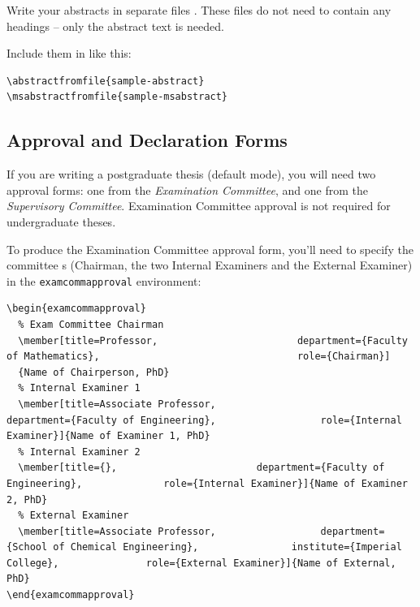 \documentclass[a4paper,nofonts,raggedright,titlepage,openany]{tufte-book}
\begin{document}
Write your abstracts in separate files . These files do not need to contain any headings -- only the abstract text is needed.

Include them in  like this:
\begin{verbatim}
\abstractfromfile{sample-abstract}
\msabstractfromfile{sample-msabstract}
\end{verbatim}



\subsection{Approval and Declaration Forms}
\label{sec:approval}

If you are writing a postgraduate thesis (default mode), you will need two approval forms: one from the \emph{Examination Committee}, and one from the \emph{Supervisory Committee}. Examination Committee approval is  not required for undergraduate theses.

To produce the Examination Committee approval form, you'll need to specify the committee \texttt{\member}s (Chairman, the two Internal Examiners and the External Examiner) in the \texttt{examcommapproval} environment: 



\begin{verbatim}
\begin{examcommapproval}
  % Exam Committee Chairman
  \member[title=Professor,                        department={Faculty of Mathematics},                                  role={Chairman}]
  {Name of Chairperson, PhD}
  % Internal Examiner 1
  \member[title=Associate Professor,                         department={Faculty of Engineering},                  role={Internal Examiner}]{Name of Examiner 1, PhD}
  % Internal Examiner 2
  \member[title={},                        department={Faculty of Engineering},              role={Internal Examiner}]{Name of Examiner 2, PhD}
  % External Examiner
  \member[title=Associate Professor,                  department={School of Chemical Engineering},                institute={Imperial College},               role={External Examiner}]{Name of External, PhD}
\end{examcommapproval}
\end{verbatim}
\end{document}
